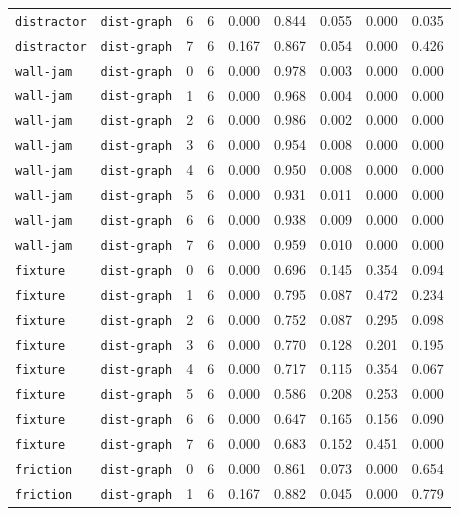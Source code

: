 \documentclass{article}
\begin{document}
\begin{center}
\begin{tabular}{lllcccccc}
\texttt{distractor} & \texttt{dist-graph} & 6 & 6 & 0.000 & 0.844 & 0.055 & 0.000 & 0.035 \\
\texttt{distractor} & \texttt{dist-graph} & 7 & 6 & 0.167 & 0.867 & 0.054 & 0.000 & 0.426 \\
\texttt{wall-jam} & \texttt{dist-graph} & 0 & 6 & 0.000 & 0.978 & 0.003 & 0.000 & 0.000 \\
\texttt{wall-jam} & \texttt{dist-graph} & 1 & 6 & 0.000 & 0.968 & 0.004 & 0.000 & 0.000 \\
\texttt{wall-jam} & \texttt{dist-graph} & 2 & 6 & 0.000 & 0.986 & 0.002 & 0.000 & 0.000 \\
\texttt{wall-jam} & \texttt{dist-graph} & 3 & 6 & 0.000 & 0.954 & 0.008 & 0.000 & 0.000 \\
\texttt{wall-jam} & \texttt{dist-graph} & 4 & 6 & 0.000 & 0.950 & 0.008 & 0.000 & 0.000 \\
\texttt{wall-jam} & \texttt{dist-graph} & 5 & 6 & 0.000 & 0.931 & 0.011 & 0.000 & 0.000 \\
\texttt{wall-jam} & \texttt{dist-graph} & 6 & 6 & 0.000 & 0.938 & 0.009 & 0.000 & 0.000 \\
\texttt{wall-jam} & \texttt{dist-graph} & 7 & 6 & 0.000 & 0.959 & 0.010 & 0.000 & 0.000 \\
\texttt{fixture} & \texttt{dist-graph} & 0 & 6 & 0.000 & 0.696 & 0.145 & 0.354 & 0.094 \\
\texttt{fixture} & \texttt{dist-graph} & 1 & 6 & 0.000 & 0.795 & 0.087 & 0.472 & 0.234 \\
\texttt{fixture} & \texttt{dist-graph} & 2 & 6 & 0.000 & 0.752 & 0.087 & 0.295 & 0.098 \\
\texttt{fixture} & \texttt{dist-graph} & 3 & 6 & 0.000 & 0.770 & 0.128 & 0.201 & 0.195 \\
\texttt{fixture} & \texttt{dist-graph} & 4 & 6 & 0.000 & 0.717 & 0.115 & 0.354 & 0.067 \\
\texttt{fixture} & \texttt{dist-graph} & 5 & 6 & 0.000 & 0.586 & 0.208 & 0.253 & 0.000 \\
\texttt{fixture} & \texttt{dist-graph} & 6 & 6 & 0.000 & 0.647 & 0.165 & 0.156 & 0.090 \\
\texttt{fixture} & \texttt{dist-graph} & 7 & 6 & 0.000 & 0.683 & 0.152 & 0.451 & 0.000 \\
\texttt{friction} & \texttt{dist-graph} & 0 & 6 & 0.000 & 0.861 & 0.073 & 0.000 & 0.654 \\
\texttt{friction} & \texttt{dist-graph} & 1 & 6 & 0.167 & 0.882 & 0.045 & 0.000 & 0.779 \\
\bottomrule
\end{tabular}
\end{center}
\end{document}
